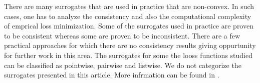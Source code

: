 There are many surrogates that are used in practice that are non-convex. In such cases, one has to analyze the consistency and also the computational complexity of emprical loss minimization. Some of the surrogates used in practice are proven to be consistent whereas some are proven to be inconsistent. There are a few practical approaches for which there are no consistency results giving oppurtunity for further work in this area. The surrogates for some the looss functions studied can be classified as pointwise, pairwise and listwise. We do not categorize the surrogates presented in this article. More infrmation can be found in \cite{li2011short}.

